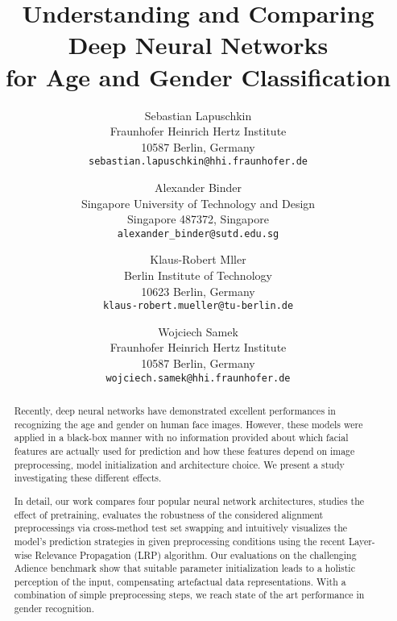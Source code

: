\documentclass[10pt,twocolumn,letterpaper]{article}
\begin{document}
\title{Understanding and Comparing Deep Neural Networks\\ for Age and Gender Classification}

\author{Sebastian Lapuschkin\\
Fraunhofer Heinrich Hertz Institute\\
10587 Berlin, Germany\\
{\tt\small sebastian.lapuschkin@hhi.fraunhofer.de}
%
\and
Alexander Binder\\
Singapore University of Technology and Design\\
Singapore 487372, Singapore\\
{\tt\small alexander\_binder@sutd.edu.sg}
%
\and
Klaus-Robert Mller\\
Berlin Institute of Technology\\
10623 Berlin, Germany\\
{\tt\small klaus-robert.mueller@tu-berlin.de}
%
\and
Wojciech Samek\\
Fraunhofer Heinrich Hertz Institute\\
10587 Berlin, Germany\\
{\tt\small wojciech.samek@hhi.fraunhofer.de}
}
\maketitle
\thispagestyle{empty}


\begin{abstract}
Recently, deep neural networks have demonstrated excellent performances in recognizing the age and gender on human face images.
However, these models were applied in a black-box manner with no information provided about which facial features are actually used for prediction
and how these features depend on image preprocessing, model initialization and architecture choice.
We present a study investigating these different effects.

In detail, our work compares four popular neural network architectures, studies the effect of pretraining, evaluates the robustness of the considered alignment preprocessings via cross-method test set swapping and intuitively visualizes the model's prediction strategies in given preprocessing conditions using the recent Layer-wise Relevance Propagation (LRP) algorithm.
Our evaluations on the challenging Adience benchmark show that suitable parameter initialization leads to a holistic perception of the input, compensating artefactual data representations. With a combination of simple preprocessing steps, we reach state of the art performance in gender recognition.



\end{abstract}
\end{document}
